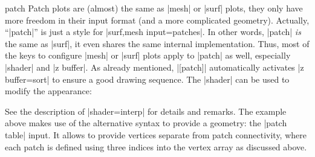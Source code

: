 {\begin{plottype}[/pgfplots]{patch}
    Patch plots are (almost) the same as |mesh| or |surf| plots, they only have
    more freedom in their input format (and a more complicated geometry).
    Actually, ``|patch|'' is just a style for |surf,mesh input=patches|. In
    other words, |patch| \emph{is} the same as |surf|, it even shares the same
    internal implementation. Thus, most of the keys to configure |mesh| or
    |surf| plots apply to |patch| as well, especially |shader| and |z buffer|.
    As already mentioned, |[patch]| automatically activates
    |z buffer=sort| to ensure a good drawing sequence. The |shader| can be used
    to modify the appearance:
\pgfplotsexpensiveexample
\begin{codeexample}[]
\end{codeexample}

    See the description of |shader=interp| for details and remarks. The example
    above makes use of the alternative syntax to provide a geometry: the
    |patch table| input. It allows to provide vertices separate from patch
    connectivity, where each patch is defined using three indices into the
    vertex array as discussed above.

\pgfplotsexpensiveexample
\begin{codeexample}[]
\end{codeexample}


\end{plottype}}
